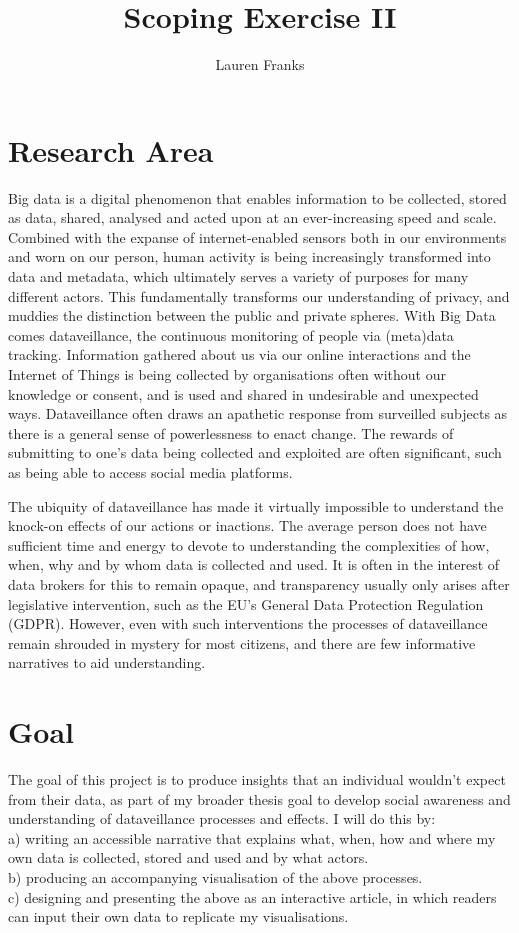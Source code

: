 \documentclass{article}
\title{Scoping Exercise II}
\author{Lauren Franks}
\begin{document}
\maketitle


\section{Research Area}
Big data is a digital phenomenon that enables information to be collected, stored as data, shared, analysed and acted upon at an ever-increasing speed and scale. Combined with the expanse of internet-enabled sensors both in our environments and worn on our person, human activity is being increasingly transformed into data and metadata, which ultimately serves a variety of purposes for many different actors. This fundamentally transforms our understanding of privacy, and muddies the distinction between the public and private spheres. With Big Data comes dataveillance, the continuous monitoring of people via (meta)data tracking. Information gathered about us via our online interactions and the Internet of Things is being collected by organisations often without our knowledge or consent, and is used and shared in undesirable and unexpected ways. Dataveillance often draws an apathetic response from surveilled subjects as there is a general sense of powerlessness to enact change. The rewards of submitting to one’s data being collected and exploited are often significant, such as being able to access social media platforms.

The ubiquity of dataveillance has made it virtually impossible to understand the knock-on effects of our actions or inactions. The average person does not have sufficient time and energy to devote to understanding the complexities of how, when, why and by whom data is collected and used. It is often in the interest of data brokers for this to remain opaque, and transparency usually only arises after legislative intervention, such as the EU’s General Data Protection Regulation (GDPR). However, even with such interventions the processes of dataveillance remain shrouded in mystery for most citizens, and there are few informative narratives to aid understanding. 

\section{Goal}
The goal of this project is to produce insights that an individual wouldn't expect from their data, as part of my broader thesis goal to develop social awareness and understanding of dataveillance processes and effects. 
I will do this by:\\
a)	writing an accessible narrative that explains what, when, how and where my own data is collected, stored and used and by what actors.\\
b)	producing an accompanying visualisation of the above processes.\\
c)	designing and presenting the above as an interactive article, in which readers can input their own data to replicate my visualisations.
\end{document}
